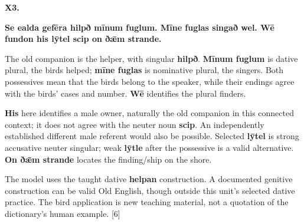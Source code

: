 \par\begin{minipage}{\linewidth}\raggedright
\textbf{X3.}

\textbf{Se ealda gefēra hilpð mīnum fuglum. Mīne fuglas singað wel. Wē fundon his lȳtel scip on ðǣm strande.}

The old companion is the helper, with singular \textbf{hilpð}. \textbf{Mīnum fuglum} is dative plural, the birds helped; \textbf{mīne fuglas} is nominative plural, the singers. Both possessives mean that the birds belong to the speaker, while their endings agree with the birds' cases and number. \textbf{Wē} identifies the plural finders.

\textbf{His} here identifies a male owner, naturally the old companion in this connected context; it does not agree with the neuter noun \textbf{scip}. An independently established different male referent would also be possible. Selected \textbf{lȳtel} is strong accusative neuter singular; weak \textbf{lȳtle} after the possessive is a valid alternative. \textbf{On ðǣm strande} locates the finding/\allowbreak{}ship on the shore.

The model uses the taught dative \textbf{helpan} construction. A documented genitive construction can be valid Old English, though outside this unit's selected dative practice. The bird application is new teaching material, not a quotation of the dictionary's human example. [6]

\end{minipage}\par\addvspace{4pt}

